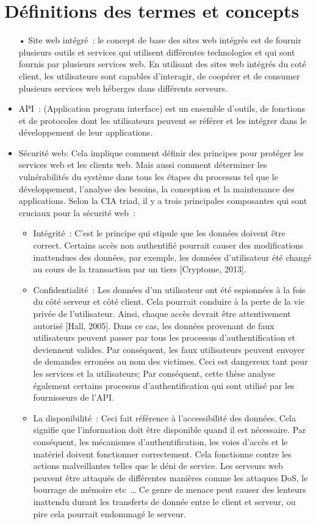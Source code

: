 \section{Définitions des termes et concepts}
\begin{itemize}
\item[•]  Site web intégré : le concept de base des sites web intégrés est de fournir plusieurs outils et services qui utilisent différentes technologies et qui sont fournis par plusieurs services web. En utilisant des sites web intégrés du coté client, les utilisateurs sont capables d'interagir, de coopérer et de consumer plusieurs services web héberges dans différents serveurs.

\item  API : (Application program interface)  est un ensemble d'outils,  de fonctions et de protocoles dont les utilisateurs peuvent se référer et les intégrer dans le développement de leur applications.

\item  Sécurité web: Cela implique comment définir des principes pour protéger les services web et les clients web. Mais aussi comment déterminer les vulnérabilités du  système dans tous les étapes du processus tel que le développement, l'analyse des besoins, la conception et la maintenance des applications. Selon la CIA triad, il y a trois principales composantes qui sont cruciaux pour la sécurité web :
 \begin{itemize}
 \item Intégrité : C'est le principe qui stipule que les données doivent être correct. Certains accès non authentifié pourrait causer des modifications inattendues des données, par exemple, les données d'utilisateur été changé au cours de la transaction par un tiers [Cryptome, 2013]. 
 \item Confidentialité : Les données d'un utilisateur ont été espionnées à la fois du côté serveur et côté client. Cela pourrait conduire à la perte de la vie privée de l'utilisateur. Ainsi, chaque accès devrait être attentivement  autorisé [Hall, 2005]. Dans ce cas, les données provenant de faux utilisateurs  peuvent passer par tous les processus d'authentification et deviennent valides. Par conséquent, les faux utilisateurs peuvent envoyer de demandes erronées au nom des victimes. Ceci est dangereux tant pour les services et la utilisateurs; Par conséquent, cette thèse analyse également certains processus d'authentification qui sont utilisé par les fournisseurs de l'API.
 \item La disponibilité : Ceci fait référence à l'accessibilité des données. Cela signifie que l'information doit être disponible quand il est nécessaire. Par conséquent, les mécanismes d'authentification, les voies d'accès et le matériel doivent fonctionner correctement. Cela fonctionne contre les actions malveillantes telles que le déni de service. Les serveurs web peuvent être attaqués de différentes manières comme les attaques DoS, le bourrage de mémoire etc … Ce genre de menace peut causer des lenteurs inattendu durant les transferts de donnée entre le client et serveur, ou pire cela pourrait endommagé le serveur.
 \end{itemize}
\end{itemize}
